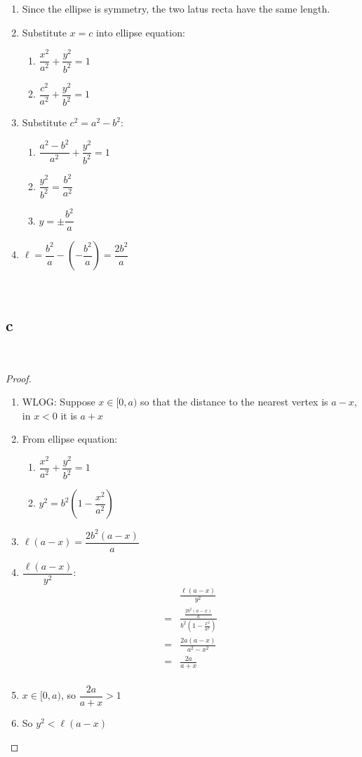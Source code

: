 \documentclass{article}
\begin{document}
\begin{enumerate}
    \item Since the ellipse is symmetry, the two latus recta have the same length.
    \item Substitute $x=c$ into ellipse equation:
        \begin{enumerate}
            \item $\dfrac{x^2}{a^2}+\dfrac{y^2}{b^2}=1$
            \item $\dfrac{c^2}{a^2}+\dfrac{y^2}{b^2}=1$
        \end{enumerate}
    \item Substitute $c^2=a^2-b^2$:
        \begin{enumerate}
            \item $\dfrac{a^2-b^2}{a^2}+\dfrac{y^2}{b^2}=1$
            \item $\dfrac{y^2}{b^2}=\dfrac{b^2}{a^2}$
            \item $y=\pm\dfrac{b^2}{a}$
        \end{enumerate}
    \item $\ell=\dfrac{b^2}{a}-(-\dfrac{b^2}{a})=\dfrac{2b^2}{a}$
\end{enumerate}

~

\subsection*{c}

~

\begin{proof}
    ~
    \begin{enumerate}
    \item WLOG: Suppose $x\in[0,a)$ so that the distance to the nearest vertex is $a-x$, in $x<0$ it is $a+x$
    \item From ellipse equation:
        \begin{enumerate}
            \item $\dfrac{x^2}{a^2}+\dfrac{y^2}{b^2}=1$
            \item $y^2=b^2(1-\dfrac{x^2}{a^2})$
        \end{enumerate}
    \item $\ell(a-x)=\dfrac{2b^2(a-x)}{a}$
    \item $\dfrac{\ell(a-x)}{y^2}$:
        \begin{align*}
            &\frac{\ell(a-x)}{y^2}\\
            =&\frac{\frac{2b^2(a-x)}{a}}{b^2(1-\frac{x^2}{a^2})}\\
            =&\frac{2a(a-x)}{a^2-x^2}\\
            =&\frac{2a}{a+x}\\
        \end{align*}
    \item $x\in[0,a)$, so $\dfrac{2a}{a+x}>1$
    \item So $y^2<\ell(a-x)$
\end{enumerate}
\end{proof}
\end{document}
